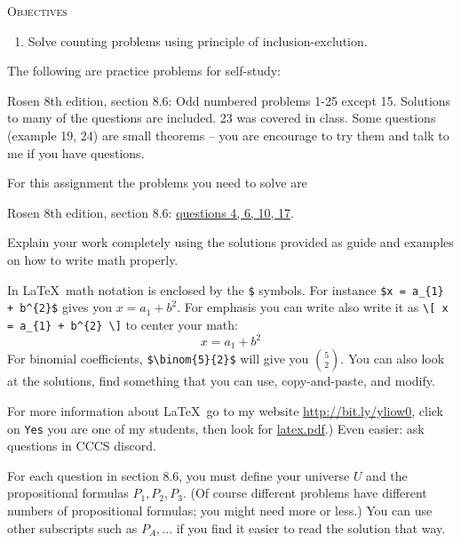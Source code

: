 

\renewcommand\AUTHOR{nweadick1@cougars.ccis.edu} %


\topmattertwo

\textsc{Objectives}
\begin{enumerate}
\item Solve counting problems using principle of
inclusion-exclution.
\end{enumerate}
\vspace{1cm}



The following are practice problems for self-study:
\begin{enumerate}[nosep]
\li Rosen 8th edition, section 8.6: Odd numbered problems 1-25 except 15.
Solutions to many of the questions are included.
23 was covered in class.
Some questions (example 19, 24) are small theorems -- you are
encourage to try them and talk to me if you have questions.
\end{enumerate}
For this assignment the problems you need to solve are
\begin{enumerate}[nosep]
\li Rosen 8th edition, section 8.6: \underline{questions 4, 6, 10, 17}.
\end{enumerate}
Explain your work completely using the solutions provided as
guide and examples on how to write math properly.

In \LaTeX\, math notation is enclosed by the \verb!$! symbols.
For instance \verb!$x = a_{1} + b^{2}$! gives you $x = a_{1} + b^{2}$.
For emphasis you can write also write it as
\verb!\[ x = a_{1} + b^{2} \]!
to center your math:
\[
x = a_{1} + b^{2}
\]
For binomial coefficients, \verb!$\binom{5}{2}$! will give you 
$\binom{5}{2}$.
You can also look at the solutions, find something that you can use,
copy-and-paste, and modify.

For more information about \LaTeX\, go to my
website
\href{http://bit.ly/yliow0}{http://bit.ly/yliow0},
click on \verb!Yes!
you are one of my students,
then look for
\href{https://drive.google.com/file/d/0BzjYrK0VFuMWZm5xV0kyR3J2Zm8/view?usp=sharing}{latex.pdf}.)
Even easier: ask questions in CCCS discord.




For each question in section 8.6,
you must define your universe $U$ and
the propositional formulas $P_1, P_2, P_3$.
(Of course different problems have different numbers of
propositional formulas; you might need more or less.) 
You can use other subscripts such as $P_A, ...$
if you find it easier to read the solution that way.

